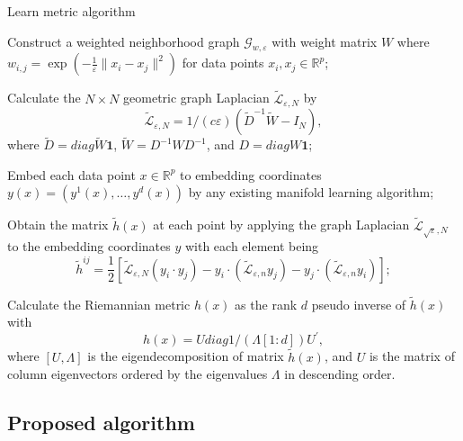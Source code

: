 \documentclass[11pt,a4paper,]{article}
\begin{document}
\begin{algorithm}[!htb]
  \caption{Learn metric algorithm}
  \label{alg:learnmetric}
  \DontPrintSemicolon
  \SetAlgoLined
  \BlankLine
  \begin{algorithmic}[1]

  \STATE Construct a weighted neighborhood graph $\mathcal{G}_{w,\varepsilon}$ with weight matrix $W$ where $w_{i,j}=\exp(-\frac{1}{\varepsilon}\|x_i-x_j\|^2)$ for data points $x_i,x_j \in \mathbb{R}^p$;

  \STATE Calculate the $N\times N$ geometric graph Laplacian $\widetilde{\mathcal{L}}_{\varepsilon,N}$ by
  $$
  \widetilde{\mathcal{L}}_{\varepsilon,N} = 1/(c\varepsilon)(\widetilde{D}^{-1} \widetilde{W} - I_N),
  $$
  where $\widetilde{D}=diag{\widetilde{W}\pmb{1}}$, $\widetilde{W} = D^{-1}WD^{-1}$, and $D = diag{W\pmb{1}}$;

  \STATE Embed each data point $x\in \mathbb{R}^p$ to embedding coordinates $y(x)=(y^1(x),\dots,y^d(x))$ by any existing manifold learning algorithm;

  \STATE Obtain the matrix $\tilde{h}(x)$ at each point by applying the graph Laplacian $\widetilde{\mathcal{L}}_{\sqrt{\varepsilon},N}$ to the embedding coordinates $y$ with each element being
  $$
    \tilde{h}^{i j}=\frac{1}{2}\left[\tilde{\mathcal{L}}_{\varepsilon, N}\left(y_i \cdot y_j\right)-y_i \cdot\left(\tilde{\mathcal{L}}_{\varepsilon, n} y_j\right)-y_j \cdot\left(\tilde{\mathcal{L}}_{\varepsilon, n} y_i\right)\right];
  $$

  \STATE Calculate the Riemannian metric $h(x)$ as the rank $d$ pseudo inverse of $\tilde{h}(x)$ with 
  $$
    h(x) = U diag{1/(\Lambda[1:d])} U^\prime,
  $$
  where $[U, \Lambda]$ is the eigendecomposition of matrix $\tilde{h}(x)$, and $U$ is the matrix of column eigenvectors ordered by the eigenvalues $\Lambda$ in descending order.

  \end{algorithmic}
\end{algorithm}

\hypertarget{proposed-algorithm}{%
\subsection{Proposed algorithm}\label{proposed-algorithm}}
\end{document}
